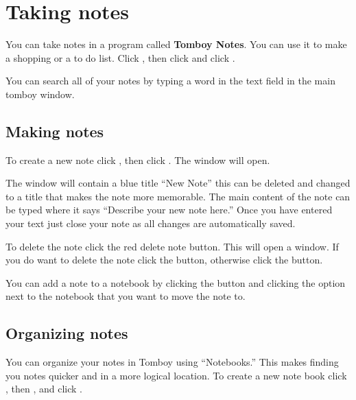 
\section{Taking notes}

You can take notes in a program called \textbf{Tomboy Notes}. You can use it to 
make a shopping or a to do list. Click , then click 
 and click .



You can search all of your notes by typing a word in the  text 
field in the main tomboy window.

\subsection{Making notes}

To create a new note click , then click . The 
 window will open.

The  window will contain a blue title ``New Note'' \dash this can be 
deleted and changed to a title that makes the note more memorable. The main content 
of the note can be typed where it says ``Describe your new note here.'' Once you have 
entered your text just close your note as all changes are automatically saved.

To delete the note click the red delete note button. This will open a  
window. If you do want to delete the note click the  button, otherwise
click the  button.

You can add a note to a notebook by clicking the  button and clicking
the option next to the notebook that you want to move the note to.


\subsection{Organizing notes}

You can organize your notes in Tomboy using ``Notebooks.'' This makes finding you 
notes quicker and in a more logical location. To create a new note book click , 
then , and click . 

